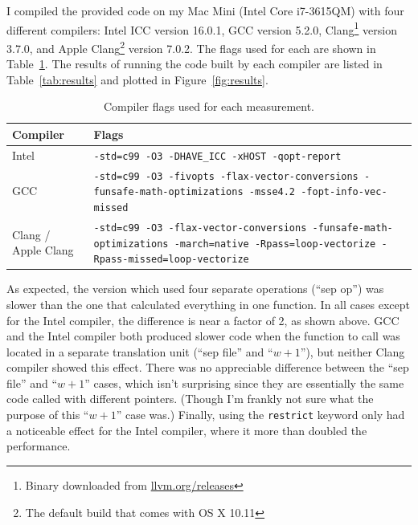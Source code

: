 \documentclass{article}
\begin{document}
    I compiled the provided code on my Mac Mini (Intel Core i7-3615QM) with four different compilers: Intel ICC version 16.0.1, GCC version 5.2.0, Clang\footnote{Binary downloaded from \url{llvm.org/releases}} version 3.7.0, and Apple Clang\footnote{The default build that comes with OS X 10.11} version 7.0.2. The flags used for each are shown in Table~\ref{tab:flags}. The results of running the code built by each compiler are listed in Table~\ref{tab:results} and plotted in Figure~\ref{fig:results}.

    \begin{table}[tb]
        \centering
        \begin{tabularx}{\textwidth}{lX}
            \toprule
            Compiler & Flags \\
            \midrule
            Intel & \texttt{-std=c99 -O3 -DHAVE\_ICC  -xHOST -qopt-report} \\
            GCC & \texttt{-std=c99 -O3 -fivopts -flax-vector-conversions -funsafe-math-optimizations -msse4.2 -fopt-info-vec-missed} \\
            Clang / Apple Clang & \texttt{-std=c99 -O3 -flax-vector-conversions -funsafe-math-optimizations -march=native -Rpass=loop-vectorize -Rpass-missed=loop-vectorize} \\
            \bottomrule
        \end{tabularx}
        \caption{Compiler flags used for each measurement.}
        \label{tab:flags}
    \end{table}

    As expected, the version which used four separate operations (``sep op'') was slower than the one that calculated everything in one function. In all cases except for the Intel compiler, the difference is near a factor of 2, as shown above. GCC and the Intel compiler both produced slower code when the function to call was located in a separate translation unit (``sep file'' and ``$w+1$''), but neither Clang compiler showed this effect. There was no appreciable difference between the ``sep file'' and ``$w+1$'' cases, which isn't surprising since they are essentially the same code called with different pointers. (Though I'm frankly not sure what the purpose of this ``$w+1$'' case was.) Finally, using the \texttt{restrict} keyword only had a noticeable effect for the Intel compiler, where it more than doubled the performance.
\end{document}
